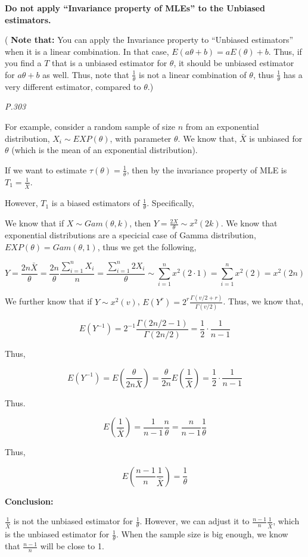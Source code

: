 \documentclass[]{book}
\begin{document}
\textbf{Do not apply ``Invariance property of MLEs'' to the Unbiased estimators.}

( \textbf{Note that:} You can apply the Invariance property to ``Unbiased estimators'' when it is a linear combination. In that case, \(E(a\theta+b)=aE(\theta)+b\). Thus, if you find a \(T\) that is a unbiased estimator for \(\theta\), it should be unbiased estimator for \(a\theta+b\) as well. Thus, note that \(\frac{1}{\theta}\) is not a linear combination of \(\theta\), thus \(\frac{1}{\theta}\) has a very different estimator, compared to \(\theta\).)

\emph{P.303}

For example, consider a random sample of size \(n\) from an exponential distribution, \(X_i \sim EXP(\theta)\), with parameter \(\theta\). We know that, \(\bar{X}\) is unbiased for \(\theta\) (which is the mean of an exponential distribution).

If we want to estimate \(\tau(\theta)=\frac{1}{\theta}\), then by the invariance property of MLE is \(T_1=\frac{1}{\bar{X}}\).

However, \(T_1\) is a biased estimators of \(\frac{1}{\theta}\). Specifically,

We know that if \(X \sim Gam(\theta,k)\), then \(Y=\frac{2X}{\theta} \sim x^2(2k)\). We know that exponential distributions are a specicial case of Gamma distribution, \(EXP(\theta)=Gam(\theta,1)\), thus we get the following,

\[Y=\frac{2n\bar{X}}{\theta}=\frac{2n}{\theta} \frac{\sum_{i=1}^n X_i}{n}=\frac{\sum_{i=1}^n 2X_i}{\theta}\sim\sum_{i=1}^n x^2(2\cdot1)=\sum_{i=1}^n x^2(2)=x^2(2n)\]

We further know that if \(Y \sim x^2(v)\), \(E(Y^r)=2^r\frac{\Gamma(v/2+r)}{\Gamma(v/2)}\). Thus, we know that,

\[E(Y^{-1})=2^{-1} \frac{\Gamma(2n/2-1)}{\Gamma(2n/2)}=\frac{1}{2}\cdot \frac{1}{n-1}\]

Thus,

\[E(Y^{-1})=E(\frac{\theta}{2n \bar{X}})=\frac{\theta}{2n}E(\frac{1}{\bar{X}})=\frac{1}{2}\cdot \frac{1}{n-1}\]

Thus.

\[E(\frac{1}{\bar{X}})=\frac{1}{n-1}\frac{n}{\theta}=\frac{n}{n-1}\frac{1}{\theta}\]

Thus,

\[E(\frac{n-1}{n} \frac{1}{\bar{X}})=\frac{1}{\theta}\]

\textbf{Conclusion:}

\(\frac{1}{\bar{X}}\) is not the unbiased estimator for \(\frac{1}{\theta}\). However, we can adjust it to \(\frac{n-1}{n} \frac{1}{\bar{X}}\), which is the unbiased estimator for \(\frac{1}{\theta}\). When the sample size is big enough, we know that \(\frac{n-1}{n}\) will be close to 1.
\end{document}

